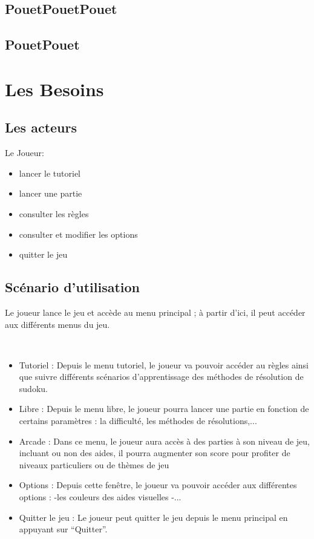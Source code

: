 \documentclass[12pt,a4paper]{article}
\begin{document}
	    \subsection{PouetPouetPouet}
		\subsection{PouetPouet}
	    \newpage
    
    \section{Les Besoins}
	    \subsection{Les acteurs}
		Le Joueur:
		\begin{itemize}
            \item lancer le tutoriel
            \item lancer une partie
            \item consulter les règles
            \item consulter et modifier les options
            \item quitter le jeu
		\end{itemize}
	
	    \subsection{Scénario d’utilisation}
            \textrm{Le joueur lance le jeu et accède au menu principal ; à partir d’ici, il peut accéder aux différents menus du jeu.}
            \strut{}\\[.5ex]
            \begin{itemize}
                \item Tutoriel :
    Depuis le menu tutoriel, le joueur va pouvoir accéder au règles ainsi que suivre différents scénarios d’apprentissage des méthodes de résolution de sudoku.

                \item Libre :
    Depuis le menu libre, le joueur pourra lancer une partie en fonction de certains paramètres : la difficulté, les méthodes de résolutions,...
                \item Arcade :
    Dans ce menu, le joueur aura accès à des parties à son niveau de jeu, incluant ou non des aides, il pourra augmenter son score pour profiter de niveaux particuliers ou de thèmes de jeu
    
                \item Options :
    Depuis cette fenêtre, le joueur va pouvoir accéder aux différentes options :
    -les couleurs des aides visuelles
    -...

                \item Quitter le jeu :
    Le joueur peut quitter le jeu depuis le menu principal en appuyant sur “Quitter”.
            \end{itemize}
    
\end{document}
